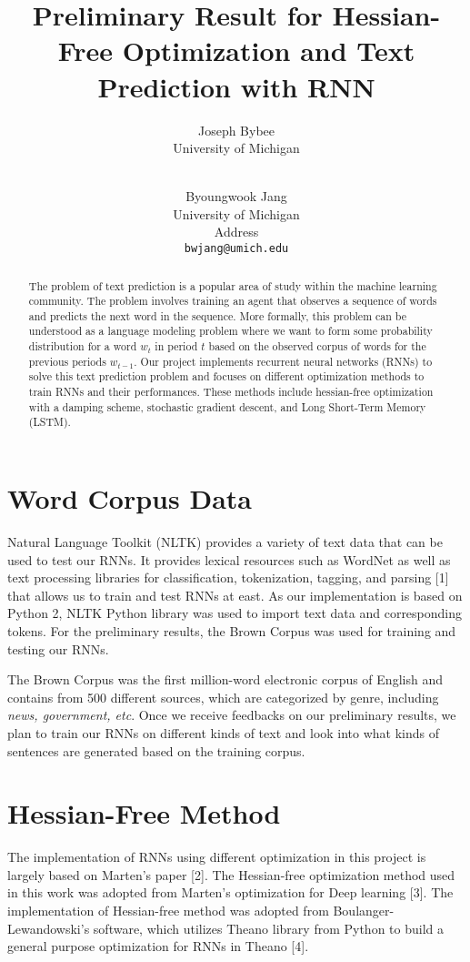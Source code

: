 \documentclass{article} %
\title{Preliminary Result for Hessian-Free Optimization and Text Prediction with RNN}
\author{
Joseph Bybee\\
University of Michigan\\
\texttt{} \\
\and
Byoungwook Jang\\
University of Michigan \\
Address \\
\texttt{bwjang@umich.edu} \\
}
\begin{document}
\maketitle

\begin{abstract}
The problem of text prediction is a popular area of study within the machine learning community. The problem involves training an agent that observes a sequence of words and predicts the next word in the sequence. More formally, this problem can be understood as a language modeling problem where we want to form some probability distribution for a word $w_t$ in period $t$ based on the observed corpus of words for the previous periods $w_{t-1}$. Our project implements recurrent neural networks (RNNs) to solve this text prediction problem and focuses on different optimization methods to train RNNs and their performances. These methods include hessian-free optimization with a damping scheme, stochastic gradient descent, and Long Short-Term Memory (LSTM). 
\end{abstract}

\section{Word Corpus Data}
Natural Language Toolkit (NLTK) provides a variety of text data that can be used to test our RNNs. It provides lexical resources such as WordNet as well as text processing libraries for classification, tokenization, tagging, and parsing [1] that allows us to train and test RNNs at east. As our implementation is based on Python 2, NLTK Python library was used to import text data and corresponding tokens. For the preliminary results, the Brown Corpus was used for training and testing our RNNs. 

The Brown Corpus was the first million-word electronic corpus of English and contains from 500 different sources, which are categorized by genre, including \textit{news, government, etc}. Once we receive feedbacks on our preliminary results, we plan to train our RNNs on different kinds of text and look into what kinds of sentences are generated based on the training corpus.

\section{Hessian-Free Method}
The implementation of RNNs using different optimization in this project is largely based on Marten's paper [2]. The Hessian-free optimization method used in this work was adopted from Marten's optimization for Deep learning [3]. The implementation of Hessian-free method was adopted from Boulanger-Lewandowski's software, which utilizes Theano library from Python to build a general purpose optimization for RNNs in Theano [4]. 
\end{document}
